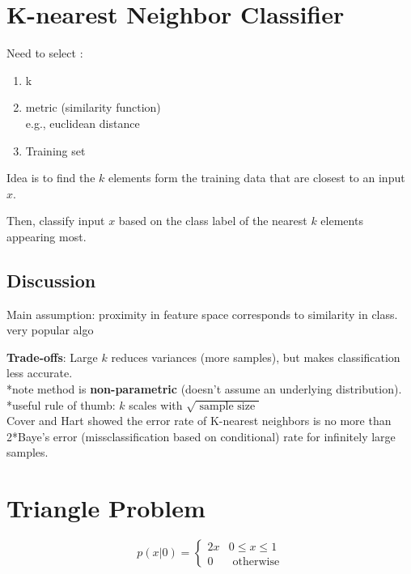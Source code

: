 \documentclass[12pt]{article}
\newcommand{\bt}[1]{\textbf{#1}} %
\begin{document}
\section*{K-nearest Neighbor Classifier}

Need to select : 
\begin{enumerate}
    \item k 
    \item metric (similarity function)\\
    e.g., euclidean distance
    \item Training set
\end{enumerate}

Idea is to find the $k$ elements form the training data that are closest to an input $x$.

Then, classify input $x$ based on the class label of the nearest $k$ elements appearing most.
\subsection*{Discussion}

Main assumption: proximity in feature space corresponds to similarity in class. \\

very popular algo

\bt{Trade-offs}: Large $k$ reduces variances (more samples), but makes classification less accurate.\\

*note method is \bt{non-parametric} (doesn't assume an underlying distribution).\\

*useful rule of thumb: $k$ scales with $\sqrt{\text{ sample size }}$\\



Cover and Hart showed the error rate of K-nearest neighbors is no more than 2*Baye's error (missclassification based on conditional) rate for infinitely large samples.

\section*{Triangle Problem}

\begin{displaymath}
   p(x | 0) = \left\{
     \begin{array}{lr}
       2x &  0 \leq x \leq 1 \\
       0 & \text{ otherwise}
     \end{array}
   \right.
\end{displaymath} 
\end{document}
